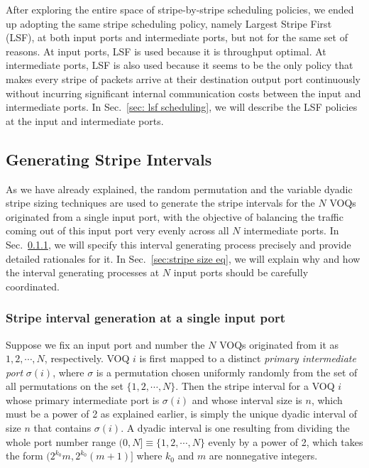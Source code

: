 After exploring the entire space of stripe-by-stripe scheduling policies,
we ended up adopting the same stripe scheduling policy, namely Largest Stripe First (LSF),
at both input ports and intermediate ports, but not for the same set of reasons.
At input ports, LSF is used because it is throughput optimal.
At intermediate ports,
LSF is also used because it seems to be the only policy that makes every stripe of packets arrive at their destination output port
continuously without incurring significant internal communication costs between the input and intermediate ports.
In Sec.~\ref{sec: lsf scheduling},
we will describe the LSF policies at the input and intermediate ports.



















\subsection{Generating Stripe Intervals}
\label{sec:stripe generation}



As we have already explained, the random permutation and the variable dyadic stripe sizing techniques are used to
generate the stripe intervals for the $N$ VOQs originated from a single input port, with the objective of 
balancing the traffic coming out of this input port very evenly across all $N$ intermediate ports.
In Sec.~\ref{subsec: size determination}, 
we will specify this interval generating process precisely and provide detailed rationales for it.  
In Sec.~\ref{sec:stripe size eq}, we will 
explain why and how the interval generating processes at $N$ input ports should be carefully coordinated.

 
\subsubsection{Stripe interval generation at a single input port}
\label{subsec: size determination}

Suppose we fix an input port and number the $N$ VOQs originated from it as $1, 2, \cdots, N$, respectively.  
VOQ $i$ is first mapped to a distinct {\it primary intermediate port}
$\sigma(i)$, where $\sigma$ is a permutation chosen uniformly randomly from the set of all permutations on the set $\{1, 2, \cdots, N\}$.  
Then the stripe interval for a VOQ $i$ whose primary intermediate port is $\sigma(i)$ and
whose interval size is $n$, which must be a power of 2 as explained earlier, is simply the unique dyadic
interval of size $n$ that contains $\sigma(i)$.  A dyadic interval is one resulting from dividing the whole port number range 
$(0, N] \equiv \{1, 2, \cdots, N\}$ evenly by a power of 2, which takes the form
$(2^{k_0} m, 2^{k_0} (m + 1)]$ where
$k_0$ and $m$ are nonnegative integers.

